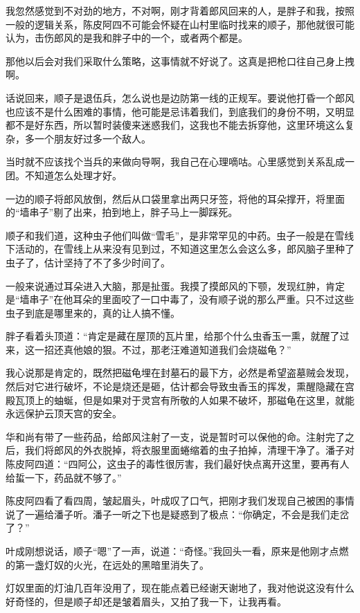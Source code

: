 我忽然感觉到不对劲的地方，不对啊，刚才背着郎风回来的人，是胖子和我，按照一般的逻辑关系，陈皮阿四不可能会怀疑在山村里临时找来的顺子，那他就很可能认为，击伤郎风的是我和胖子中的一个，或者两个都是。

那他以后会对我们采取什么策略，这事情就不好说了。这真是把枪口往自己身上拽啊。

话说回来，顺子是退伍兵，怎么说也是边防第一线的正规军。要说他打昏一个郎风也应该不是什么困难的事情，他可能是忌讳着我们，到底我们的身份不明，又明显都不是好东西，所以暂时装傻来迷惑我们，这我也不能去拆穿他，这里环境这么复杂，多一个朋友好过多一个敌人。

当时就不应该找个当兵的来做向导啊，我自己在心理嘀咕。心里感觉到关系乱成一团。不知道怎么处理才好。

一边的顺子将郎风放倒，然后从口袋里拿出两只牙签，将他的耳朵撑开，将里面的“墙串子”剔了出来，拍到地上，胖子马上一脚踩死。

顺子和我们道，这种虫子他们叫做“雪毛”，是非常罕见的中药。虫子一般是在雪线下活动的，在雪线上从来没有见到过，不知道这里怎么会这么多，郎风脑子里种了虫子了，估计坚持了不了多少时间了。

一般来说通过耳朵进入大脑，那是扯蛋。我摸了摸郎风的下颚，发现红肿，肯定是“墙串子”在他耳朵的里面咬了一口中毒了，没有顺子说的那么严重。只不过这些虫子到底是哪里来的，真的让人搞不懂。

胖子看着头顶道：“肯定是藏在屋顶的瓦片里，给那个什么虫香玉一熏，就醒了过来，这一招还真他娘的狠。不过，那老汪难道知道我们会烧磁龟？”

我心说那是肯定的，既然把磁龟埋在封墓石的最下方，必然是希望盗墓贼会发现，然后对它进行破坏，不论是烧还是砸，估计都会导致虫香玉的挥发，熏醒隐藏在宫殿瓦顶上的蚰蜒，但是如果对于灵宫有所敬的人如果不破坏，那磁龟在这里，就能永远保护云顶天宫的安全。

华和尚有带了一些药品，给郎风注射了一支，说是暂时可以保他的命。注射完了之后，我们将郎风的外衣脱掉，将衣服里面蜷缩着的虫子拍掉，清理干净了。潘子对陈皮阿四道：“四阿公，这虫子的毒性很厉害，我们最好快点离开这里，要再有人给蜇一下，药品就不够了。”

陈皮阿四看了看四周，皱起眉头，叶成叹了口气，把刚才我们发现自己被困的事情说了一遍给潘子听。潘子一听之下也是疑惑到了极点：“你确定，不会是我们走岔了？”

叶成刚想说话，顺子“嗯”了一声，说道：“奇怪。”我回头一看，原来是他刚才点燃的第一盏灯奴的火光，在远处的黑暗里消失了。

灯奴里面的灯油几百年没用了，现在能点着已经谢天谢地了，我对他说这没有什么好奇怪的，但是顺子却还是皱着眉头，又拍了我一下，让我再看。

